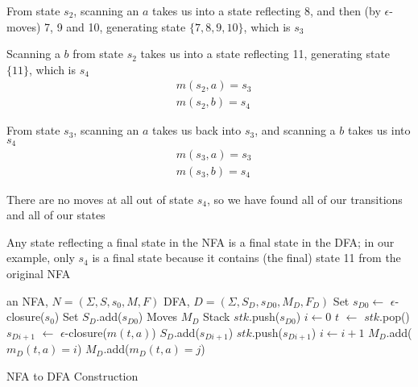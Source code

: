\documentclass[8pt,a4paper,compress]{beamer}
\begin{document}
\begin{frame}[fragile]
\pause

From state $s_2$, scanning an $a$ takes us into a state reflecting 8, and then (by $\epsilon$-moves) 7, 9 and 10, generating state $\{7, 8, 9, 10\}$, which is $s_3$

\pause
\bigskip

Scanning a $b$ from state $s_2$ takes us into a state reflecting 11, generating state $\{11\}$, which is $s_4$
\begin{align}
& m(s_2, a) = s_3 \nonumber \\
& m(s_2, b) = s_4 \nonumber
\end{align}

\pause
\bigskip

From state $s_3$, scanning an $a$ takes us back into $s_3$, and scanning a $b$ takes us into $s_4$
\begin{align}
& m(s_3, a) = s_3 \nonumber \\
& m(s_3, b) = s_4 \nonumber
\end{align}

\pause
\bigskip

There are no moves at all out of state $s_4$, so we have found all of our transitions and all of our states

\pause
\bigskip

Any state reflecting a final state in the NFA is a final state in the DFA; in our example, only $s_4$ is a final state because it contains (the final) state 11 from the original NFA
\end{frame}

\begin{frame}[fragile]
\pause

The DFA derived from our NFA for the regular expression $(a|b)a*b$ is shown below
\begin{center}
}
\end{center}
\end{frame}

\begin{frame}[fragile]
\pause

\begin{algorithm}[H]
\begin{algorithmic}
\REQUIRE an NFA, $N = (\Sigma, S, s_0, M, F)$
\ENSURE DFA, $D = (\Sigma, S_D, s_{D0}, M_D, F_D)$
\STATE Set $s_{D0} \gets$  $\epsilon$-closure($s_0$)
\STATE Set $S_D$.add($s_{D0}$)
\STATE Moves $M_D$
\STATE Stack $stk$.push($s_{D0}$)
\STATE $i \gets 0$
\STATE $t$ $\gets$ $stk$.pop()
\STATE $s_{Di+1}$ $\gets$ $\epsilon$-closure($m(t, a)$)
\STATE $S_D$.add($s_{Di+1}$) 
\STATE $stk$.push($s_{Di+1}$)
\STATE $i \gets i + 1$
\STATE $M_D$.add($m_D(t,a) = i$)
\STATE $M_D$.add($m_D(t, a) = j$) 
\ENDIF
\ENDIF
\ENDFOR
\ENDWHILE
\end{algorithmic}
\caption{NFA to DFA Construction}
\end{algorithm}
\end{frame}
\end{document}
